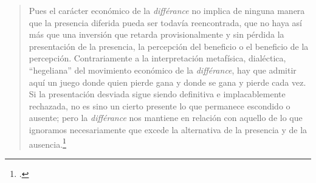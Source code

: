 \begin{quote}
Pues el carácter económico de la \emph{différance} no implica de ninguna manera que la presencia diferida pueda ser todavía reencontrada, que no haya así más que una inversión que retarda provisionalmente y sin pérdida la presentación de la presencia, la percepción del beneficio o el beneficio de la percepción. Contrariamente a la interpretación metafísica, dialéctica, \enquote{hegeliana} del movimiento económico de la \emph{différance}, hay que admitir aquí un juego donde quien pierde gana y donde se gana y pierde cada vez. Si la presentación desviada sigue siendo definitiva e implacablemente rechazada, no es sino un cierto presente lo que permanece escondido o ausente; pero la \emph{différance} nos mantiene en relación con aquello de lo que ignoramos necesariamente que excede la alternativa de la presencia y de la ausencia.\footcites[21]{@6980-DERRIDA1989}[La \emph{différance} al mismo tiempo que no puede entenderse como un antihegelianismo indicativo, no se comprende desde la circularidad de sentido de la dialéctica: \enquote{La \emph{différance} debe señalar el punto de ruptura con el sistema de la \emph{Aufhebung} y de la dialéctica especulativa. Esta conflictualidad de la différance, que no se puede llamar contradicción, que a condición de demarcarla por un largo trabajo de la de Hegel, no dejándose nunca relevar totalmente, marca sus efectos en lo que he llamado el texto en general, en un texto que no se contiene en el reducto del libro o de la biblioteca y no se deja nunca dirigir por un referente en el sentido clásico, por una cosa o por un significado transcendental que regularía todo el movimiento. No es, como se puede ver, por prurito de apaciguamiento o reconciliación por lo que recurro de buena gana a la marca \enquote{\emph{différance}} antes que al sistema de la diferencia-y-de-la-contradicción}.][58]{@6993-DERRIDA1877}[Al respecto, señala Caterina Resta: \enquote{Se trata de pensar una mediación sin oposición: «La \emph{différance} afirma una \enquote{diferencia radical}, una radical alteridad y heterogeneidad que todavía dan lugar a una relación, a una \emph{mediación}. La di-ferencia es quizá esto: relación con lo inapropiable, con lo sin-relación}.][123]{@6981-RESTA1990}
\end{quote}

